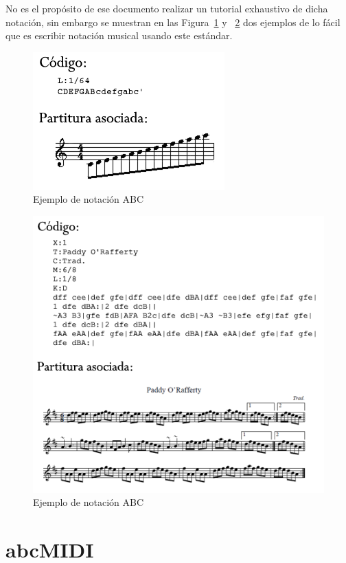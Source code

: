 \color{blue}No es el propósito de ese documento realizar un tutorial exhaustivo de dicha notación, sin embargo se muestran en las Figura~\ref{fig:abcexample} y ~\ref{fig:abcexample2} dos ejemplos de lo fácil que es escribir notación musical usando este estándar.\color{black}

		\begin{figure}[!htbp]
		\centering
		\includegraphics[scale=0.7]{graphics/abc-example.png}
		\caption{Ejemplo de notación ABC}
		\label{fig:abcexample}
		\end{figure}
		
		\begin{figure}[!htbp]
		\centering
		\includegraphics[scale=0.7]{graphics/abc-example2.png}
		\caption{Ejemplo de notación ABC}
		\label{fig:abcexample2}
		\end{figure}

\section{abcMIDI}
\label{sec:abcMIDI}

